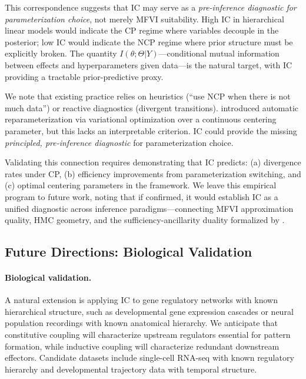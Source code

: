 \documentclass[10pt]{article} %
\theoremstyle{plain}
\theoremstyle{definition}
\begin{document}
This correspondence suggests that IC may serve as a \emph{pre-inference diagnostic for parameterization choice}, not merely MFVI suitability. High IC in hierarchical linear models would indicate the CP regime where variables decouple in the posterior; low IC would indicate the NCP regime where prior structure must be explicitly broken. The quantity $I(\theta; \Theta | Y)$---conditional mutual information between effects and hyperparameters given data---is the natural target, with IC providing a tractable prior-predictive proxy.

We note that existing practice relies on heuristics (``use NCP when there is not much data'') or reactive diagnostics (divergent transitions). \citet{gorinova2020automatic} introduced automatic reparameterization via variational optimization over a continuous centering parameter, but this lacks an interpretable criterion. IC could provide the missing \emph{principled, pre-inference diagnostic} for parameterization choice.

Validating this connection requires demonstrating that IC predicts: (a) divergence rates under CP, (b) efficiency improvements from parameterization switching, and (c) optimal centering parameters in the \citet{gorinova2020automatic} framework. We leave this empirical program to future work, noting that if confirmed, it would establish IC as a unified diagnostic across inference paradigms---connecting MFVI approximation quality, HMC geometry, and the sufficiency-ancillarity duality formalized by \citet{yu2011center}.

\subsection{Future Directions: Biological Validation}

\paragraph{Biological validation.} A natural extension is applying IC to gene regulatory networks with known hierarchical structure, such as developmental gene expression cascades or neural population recordings with known anatomical hierarchy. We anticipate that constitutive coupling will characterize upstream regulators essential for pattern formation, while inductive coupling will characterize redundant downstream effectors. Candidate datasets include single-cell RNA-seq with known regulatory hierarchy and developmental trajectory data with temporal structure.
\end{document}
